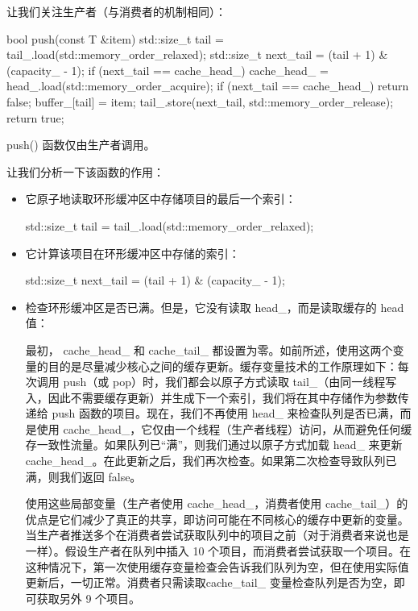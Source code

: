 让我们关注生产者（与消费者的机制相同）：

\begin{cpp}
bool push(const T &item) {
    std::size_t tail = tail_.load(std::memory_order_relaxed);
    std::size_t next_tail = (tail + 1) & (capacity_ - 1);
    if (next_tail == cache_head_) {
        cache_head_ = head_.load(std::memory_order_acquire);
        if (next_tail == cache_head_) {
            return false;
        }
    }
    buffer_[tail] = item;
    tail_.store(next_tail, std::memory_order_release);
    return true;
}
\end{cpp}

push() 函数仅由生产者调用。

让我们分析一下该函数的作用：

\begin{itemize}
\item
它原子地读取环形缓冲区中存储项目的最后一个索引：

\begin{cpp}
std::size_t tail = tail_.load(std::memory_order_relaxed);
\end{cpp}

\item
它计算该项目在环形缓冲区中存储的索引：

\begin{cpp}
std::size_t next_tail = (tail + 1) & (capacity_ - 1);
\end{cpp}

\item
检查环形缓冲区是否已满。但是，它没有读取 head\_，而是读取缓存的 head 值：

\begin{cpp}
    if (next_tail == cache_head_) {
\end{cpp}

最初， cache\_head\_ 和 cache\_tail\_ 都设置为零。如前所述，使用这两个变量的目的是尽量减少核心之间的缓存更新。缓存变量技术的工作原理如下：每次调用 push（或 pop）时，我们都会以原子方式读取 tail\_（由同一线程写入，因此不需要缓存更新）并生成下一个索引，我们将在其中存储作为参数传递给 push 函数的项目。现在，我们不再使用 head\_ 来检查队列是否已满，而是使用 cache\_head\_，它仅由一个线程（生产者线程）访问，从而避免任何缓存一致性流量。如果队列已“满”，则我们通过以原子方式加载 head\_ 来更新 cache\_head\_。在此更新之后，我们再次检查。如果第二次检查导致队列已满，则我们返回 false。

使用这些局部变量（生产者使用 cache\_head\_，消费者使用 cache\_tail\_）的优点是它们减少了真正的共享，即访问可能在不同核心的缓存中更新的变量。当生产者推送多个在消费者尝试获取队列中的项目之前（对于消费者来说也是一样）。假设生产者在队列中插入 10 个项目，而消费者尝试获取一个项目。在这种情况下，第一次使用缓存变量检查会告诉我们队列为空，但在使用实际值更新后，一切正常。消费者只需读取cache\_tail\_ 变量检查队列是否为空，即可获取另外 9 个项目。


\end{itemize}
